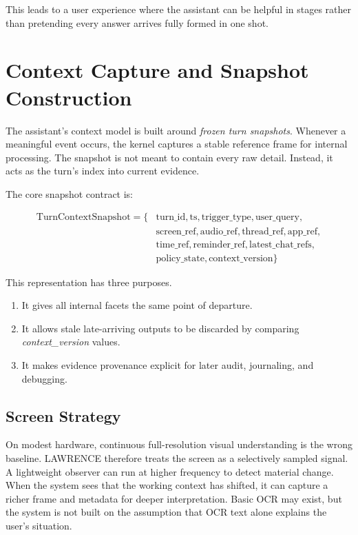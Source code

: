 \documentclass[conference]{IEEEtran}
\begin{document}
This leads to a user experience where the assistant can be helpful in stages rather than pretending every answer arrives fully formed in one shot.

\section{Context Capture and Snapshot Construction}
The assistant's context model is built around \emph{frozen turn snapshots}. Whenever a meaningful event occurs, the kernel captures a stable reference frame for internal processing. The snapshot is not meant to contain every raw detail. Instead, it acts as the turn's index into current evidence.

The core snapshot contract is:

\begin{equation}
\label{eq:snapshot}
\begin{aligned}
\mathrm{TurnContextSnapshot} = \{&
\text{turn\_id}, \text{ts}, \text{trigger\_type}, \text{user\_query},\\
&\text{screen\_ref}, \text{audio\_ref}, \text{thread\_ref}, \text{app\_ref},\\
&\text{time\_ref}, \text{reminder\_ref}, \text{latest\_chat\_refs},\\
&\text{policy\_state}, \text{context\_version}\}
\end{aligned}
\end{equation}

This representation has three purposes.

\begin{enumerate}
\item It gives all internal facets the same point of departure.
\item It allows stale late-arriving outputs to be discarded by comparing \emph{context\_version} values.
\item It makes evidence provenance explicit for later audit, journaling, and debugging.
\end{enumerate}

\subsection{Screen Strategy}
On modest hardware, continuous full-resolution visual understanding is the wrong baseline. LAWRENCE therefore treats the screen as a selectively sampled signal. A lightweight observer can run at higher frequency to detect material change. When the system sees that the working context has shifted, it can capture a richer frame and metadata for deeper interpretation. Basic OCR may exist, but the system is not built on the assumption that OCR text alone explains the user's situation.
\end{document}
